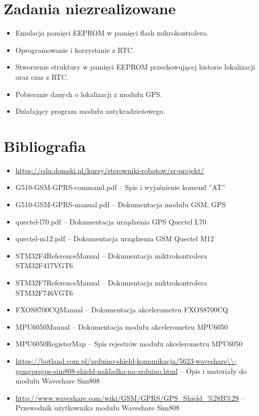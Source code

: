 \documentclass[10pt, a4paper]{article}
\begin{document}
\section{Zadania niezrealizowane}
\begin{itemize}
\item Emulacja pamięci EEPROM w pamięci flash mikrokontrolera.
\item Oprogramowanie i korzystanie z RTC.
\item Stworzenie struktury w pamięci EEPROM przechowującej historie lokalizacji oraz czas z RTC.
\item Pobieranie danych o lokalizacji z modułu GPS.
\item Działający program modułu antykradzieżowego.
\end{itemize}

\section{Bibliografia}
\begin{itemize}
\item \url {https://edu.domski.pl/kursy/sterowniki-robotow/sr-projekt/}
\item G510-GSM-GPRS-command.pdf -- Spis i wyjaśnienie komend ''AT''
\item G510-GSM-GPRS-manual.pdf -- Dokumentacja modułu GSM, GPS
\item quectel-l70.pdf -- Dokumentacja urządzenia GPS Quectel L70
\item quectel-m12.pdf -- Dokumentacja urządzenia GSM Quectel M12
\item STM32F4ReferenceManual -- Dokumentacja miktrokontrolera STM32F417VGT6
\item STM32F7ReferenceManual -- Dokumentacja miktrokontrolera STM32F746VGT6
\item FXOS8700CQManual -- Dokumentacja akcelerometru FXOS8700CQ
\item MPU6050Manual -- Dokumentacja modułu akcelerometru MPU6050
\item MPU6050RegisterMap -- Spis rejestrów modułu akcelerometru MPU6050
\item \url {https://botland.com.pl/arduino-shield-komunikacja/5623-waveshare\\-gsmgprsgps-sim808-shield-nakladka-na-arduino.html} -- Opis i materiały do modułu Waveshare Sim808
\item \url {http://www.waveshare.com/wiki/GSM/GPRS/GPS_Shield_%28B%29} -- Przewodnik użytkownika modułu Waveshare Sim808
\end{itemize}
\newpage
{}


\end{document}
